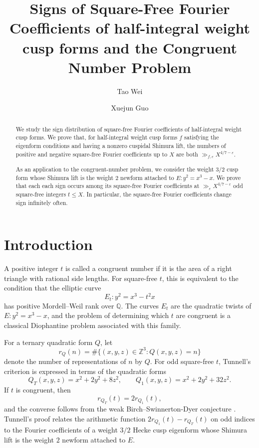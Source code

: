 \documentclass[11pt]{amsart}
\title[Sign changes in the congruent number problem]
{Signs of Square-Free Fourier Coefficients of half-integral weight cusp forms and the Congruent Number Problem}
\author{Tao Wei}
\author{Xuejun Guo}
\theoremstyle{remark}
\newcommand{\Q}{\mathbb Q}
\newcommand{\Z}{\mathbb Z}
\begin{document}
\begin{abstract}
	We study the sign distribution of square-free Fourier coefficients of
	half-integral weight cusp forms. We prove that, for half-integral weight
	cusp forms \(f\) satisfying the eigenform conditions and having a nonzero cuspidal Shimura lift, the numbers of positive and negative square-free
	Fourier coefficients up to \(X\) are both
	\(\gg_{f,\varepsilon}X^{4/7-\varepsilon}\). 
	
	As an application to the congruent-number problem, we consider the weight \(3/2\) cusp form whose Shimura lift is the weight \(2\) newform attached to $ E:y^2=x^3-x$. We prove that
	each each sign occurs among its square-free Fourier coefficients at  \(\gg_{\varepsilon}X^{4/7-\varepsilon}\) odd square-free
	integers \(t\leq X\). In particular, the square-free Fourier
	coefficients change sign infinitely often.
\end{abstract}



\maketitle

\section{Introduction}
A positive integer $t$ is called a congruent number if it is the
area of a right triangle with rational side lengths. For square-free $t$,
this is equivalent to the condition that the elliptic curve
\[
E_t:y^2=x^3-t^2x
\]
has positive Mordell--Weil rank over $\Q$. The curves $E_t$ are the
quadratic twists of $E:y^2=x^3-x$, and the problem of determining which
$t$ are congruent is a classical Diophantine problem associated with this
family.

For a ternary quadratic form \(Q\), let
\[
r_Q(n)=\#\{(x,y,z)\in\Z^3:Q(x,y,z)=n\}
\]
denote the number of representations of \(n\) by \(Q\). For odd square-free
\(t\), Tunnell's criterion is expressed in terms of the quadratic forms
\[
Q_T(x,y,z)=x^2+2y^2+8z^2,
\qquad
Q_1(x,y,z)=x^2+2y^2+32z^2.
\]
If $t$ is congruent, then
\begin{equation}\label{eq:tunnell-odd}
r_{Q_T}(t)=2r_{Q_1}(t),
\end{equation}
and the converse follows from the weak Birch--Swinnerton-Dyer conjecture
\cite{Tunnell}. Tunnell's proof relates the arithmetic function
$2r_{Q_1}(t)-r_{Q_T}(t)$ on odd indices to the Fourier coefficients of a
weight $3/2$ Hecke cusp eigenform whose Shimura lift is the weight $2$
newform attached to $E$. 
\end{document}
